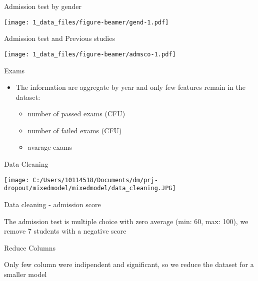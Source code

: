 \documentclass[
  ignorenonframetext,
]{beamer}
\providecommand{\tightlist}{%
  \setlength{\itemsep}{0pt}\setlength{\parskip}{0pt}}
\begin{document}
\begin{frame}{Admission test by gender}
\protect\hypertarget{admission-test-by-gender}{}

\texttt{[image: 1\_data\_files/figure-beamer/gend-1.pdf]}

\end{frame}

\begin{frame}{Admission test and Previous studies}
\protect\hypertarget{admission-test-and-previous-studies}{}

\texttt{[image: 1\_data\_files/figure-beamer/admsco-1.pdf]}

\end{frame}

\begin{frame}{Exams}
\protect\hypertarget{exams}{}

\begin{itemize}
\item
  The information are aggregate by year and only few features remain in
  the dataset:

  \begin{itemize}
  \tightlist
  \item
    number of passed exams (CFU)
  \item
    number of failed exams (CFU)
  \item
    avarage exams
  \end{itemize}
\end{itemize}

\end{frame}

\begin{frame}{Data Cleaning}
\protect\hypertarget{data-cleaning-1}{}

\texttt{[image: C:/Users/10114518/Documents/dm/prj-dropout/mixedmodel/mixedmodel/data\_cleaning.JPG]}

\end{frame}

\begin{frame}{Data cleaning - admission score}
\protect\hypertarget{data-cleaning---admission-score}{}

The admission test is multiple choice with zero average (min: 60, max:
100), we remove 7 students with a negative score

\end{frame}

\begin{frame}{Reduce Columns}
\protect\hypertarget{reduce-columns}{}

Only few column were indipendent and significant, so we reduce the
dataset for a smaller model

\end{frame}
\end{document}
